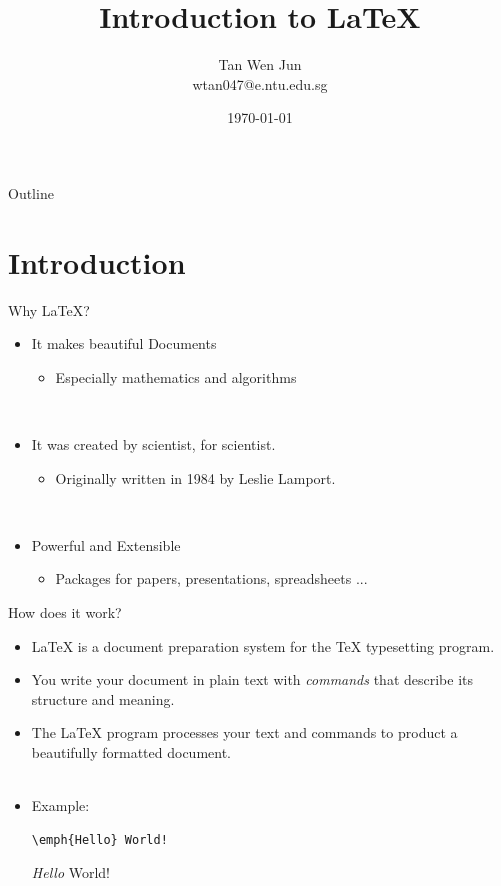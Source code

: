 \documentclass[c]{beamer}
\begin{document}
\title{Introduction to \LaTeX}
\author{Tan Wen Jun \\ wtan047@e.ntu.edu.sg}
\date{\today}

\begin{frame} %
  \titlepage
\end{frame}

\begin{frame}{Outline}
  \tableofcontents
\end{frame}

\section{Introduction}

\begin{frame}{Why \LaTeX?}
  \begin{itemize}
    \item It makes beautiful Documents
    \begin{itemize}
      \item Especially mathematics and algorithms
    \end{itemize}
    ~
    \item It was created by scientist, for scientist.
    \begin{itemize}
      \item Originally written in 1984 by Leslie Lamport.
    \end{itemize}
    ~
    \item Powerful and Extensible
    \begin{itemize}
      \item Packages for papers, presentations, spreadsheets ...
    \end{itemize}
  \end{itemize}
\end{frame}

\begin{frame}[fragile]{How does it work?}
  \begin{itemize}
    \item \LaTeX{} is a document preparation system for the \TeX{} typesetting program.
    
    \item You write your document in plain text with \emph{commands} that describe its structure and meaning.
    
    \item The \LaTeX{} program processes your text and commands to product a beautifully formatted document.\\
    ~
    \item Example: 
    
\begin{lstlisting}
\emph{Hello} World!
\end{lstlisting}

    \emph{Hello} World!
  \end{itemize}
\end{frame}
\end{document}

